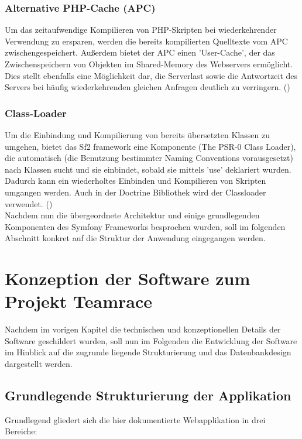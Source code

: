 \documentclass[12pt]{report}
\begin{document}
\subsection{Alternative PHP-Cache (APC)}

Um das zeitaufwendige Kompilieren von PHP-Skripten bei wiederkehrender Verwendung zu ersparen, werden die bereits kompilierten Quelltexte vom APC zwischengespeichert. 
Außerdem bietet der APC einen 'User-Cache', der das Zwischenspeichern von Objekten 
im Shared-Memory des Webservers ermöglicht. Dies stellt ebenfalls eine Möglichkeit dar, die Serverlast sowie die Antwortzeit des Servers bei häufig wiederkehrenden gleichen Anfragen deutlich zu verringern. (\cite{wiki:APC})

\subsection{Class-Loader}

Um die Einbindung und Kompilierung von bereits übersetzten Klassen zu umgehen, 
bietet das Sf2 framework eine Komponente (The PSR-0 Class Loader), die automatisch
(die Benutzung bestimmter Naming Conventions vorausgesetzt) nach Klassen sucht und
sie einbindet, sobald sie mittels 'use' deklariert wurden. Dadurch kann ein wiederholtes Einbinden und Kompilieren von Skripten umgangen werden. Auch in der Doctrine Bibliothek wird der Classloader verwendet. (\cite{php:ClassLoader})\\


Nachdem nun die übergeordnete Architektur und einige grundlegenden Komponenten des Symfony Frameworks besprochen wurden, soll im folgenden Abschnitt konkret auf die Struktur der Anwendung eingegangen werden.

\chapter{Konzeption der Software zum Projekt Teamrace}
Nachdem im vorigen Kapitel die technischen und konzeptionellen Details der Software geschildert wurden, soll nun im Folgenden die Entwicklung der Software im Hinblick auf die zugrunde liegende Strukturierung und das Datenbankdesign dargestellt werden.

\section{Grundlegende Strukturierung der Applikation}
\label{sec:ApplikationsStruktur}
Grundlegend gliedert sich die hier dokumentierte Webapplikation in drei Bereiche: 
\end{document}
